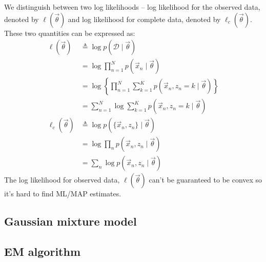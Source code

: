 We distinguish between two log likelihoods -- log likelihood for the observed data, denoted by $\ell(\vec \theta)$ and log likelihood for complete data, denoted by $\ell_c(\vec \theta)$. These two quantities can be expressed as:
\begin{align}
    \ell(\vec \theta)   &\triangleq \log p(\mathcal D \mid \vec \theta) \nonumber\\
                        &= \log \prod_{n = 1}^N p(\vec x_n \mid \vec \theta)\nonumber\\
                        &= \log \left\{\prod_{n = 1}^N \sum_{k = 1}^K p(\vec x_n, z_n = k \mid \vec \theta)\right\} \nonumber\\
                        &= \sum_{n = 1}^N \log \sum_{k = 1}^K p(\vec x_n, z_n = k \mid \vec \theta)\\
    \ell_c(\vec \theta) &\triangleq \log p\left(\{\vec x_n, z_n\} \mid \vec \theta\right) \nonumber\\
                        &= \log \prod_n p(\vec x_n, z_n \mid \vec \theta) \nonumber\\
                        &= \sum_n \log p(\vec x_n, z_n \mid \vec \theta)
\end{align}
The log likelihood for observed data, $\ell(\vec \theta)$ can't be guaranteed to be convex so it's hard to find ML/MAP estimates.
\subsection{Gaussian mixture model}
\subsection{EM algorithm}